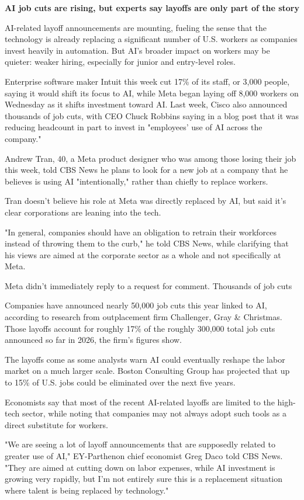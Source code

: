 \textbf{AI job cuts are rising, but experts say layoffs are only part of the story}

AI-related layoff announcements are mounting, fueling the sense that the technology is already replacing a significant number of U.S. workers as companies invest heavily in automation. But AI's broader impact on workers may be quieter: weaker hiring, especially for junior and entry-level roles.

Enterprise software maker Intuit this week cut 17\% of its staff, or 3,000 people, saying it would shift its focus to AI, while Meta began laying off 8,000 workers on Wednesday as it shifts investment toward AI. Last week, Cisco also announced thousands of job cuts, with CEO Chuck Robbins saying in a blog post that it was reducing headcount in part to invest in "employees' use of AI across the company."

Andrew Tran, 40, a Meta product designer who was among those losing their job this week, told CBS News he plans to look for a new job at a company that he believes is using AI "intentionally," rather than chiefly to replace workers.

Tran doesn't believe his role at Meta was directly replaced by AI, but said it's clear corporations are leaning into the tech.

"In general, companies should have an obligation to retrain their workforces instead of throwing them to the curb," he told CBS News, while clarifying that his views are aimed at the corporate sector as a whole and not specifically at Meta.

Meta didn't immediately reply to a request for comment.
Thousands of job cuts

Companies have announced nearly 50,000 job cuts this year linked to AI, according to research from outplacement firm Challenger, Gray \& Christmas. Those layoffs account for roughly 17\% of the roughly 300,000 total job cuts announced so far in 2026, the firm's figures show.

The layoffs come as some analysts warn AI could eventually reshape the labor market on a much larger scale. Boston Consulting Group has projected that up to 15\% of U.S. jobs could be eliminated over the next five years.

Economists say that most of the recent AI-related layoffs are limited to the high-tech sector, while noting that companies may not always adopt such tools as a direct substitute for workers.

"We are seeing a lot of layoff announcements that are supposedly related to greater use of AI," EY-Parthenon chief economist Greg Daco told CBS News. "They are aimed at cutting down on labor expenses, while AI investment is growing very rapidly, but I'm not entirely sure this is a replacement situation where talent is being replaced by technology."

